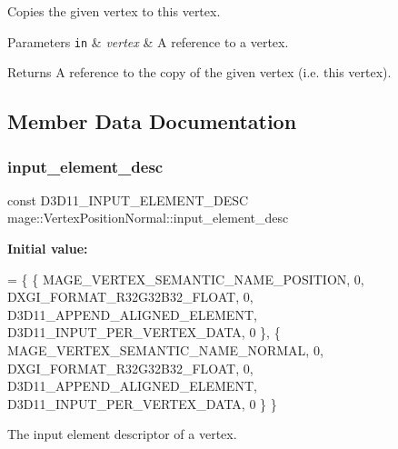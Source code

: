Copies the given vertex to this vertex.


\begin{DoxyParams}[1]{Parameters}
\mbox{\tt in}  & {\em vertex} & A reference to a vertex. \\
\hline
\end{DoxyParams}
\begin{DoxyReturn}{Returns}
A reference to the copy of the given vertex (i.\+e. this vertex). 
\end{DoxyReturn}


\subsection{Member Data Documentation}
\hypertarget{structmage_1_1_vertex_position_normal_ab4765069df93930c4fecc0029503061e}{}\label{structmage_1_1_vertex_position_normal_ab4765069df93930c4fecc0029503061e} 
\subsubsection{\texorpdfstring{input\+\_\+element\+\_\+desc}{input\_element\_desc}}
{\footnotesize\ttfamily const D3\+D11\+\_\+\+I\+N\+P\+U\+T\+\_\+\+E\+L\+E\+M\+E\+N\+T\+\_\+\+D\+E\+SC mage\+::\+Vertex\+Position\+Normal\+::input\+\_\+element\+\_\+desc\hspace{0.3cm}{\ttfamily [static]}}

{\bfseries Initial value\+:}
\begin{DoxyCode}
= \{
        \{ MAGE\_VERTEX\_SEMANTIC\_NAME\_POSITION, 0, DXGI\_FORMAT\_R32G32B32\_FLOAT,    0, 
      D3D11\_APPEND\_ALIGNED\_ELEMENT, D3D11\_INPUT\_PER\_VERTEX\_DATA, 0 \},
        \{ MAGE\_VERTEX\_SEMANTIC\_NAME\_NORMAL,   0, DXGI\_FORMAT\_R32G32B32\_FLOAT,    0, 
      D3D11\_APPEND\_ALIGNED\_ELEMENT, D3D11\_INPUT\_PER\_VERTEX\_DATA, 0 \}
    \}
\end{DoxyCode}
The input element descriptor of a vertex. \hypertarget{structmage_1_1_vertex_position_normal_a09baa618081e66e21cdfe5752dbf8df6}{}\label{structmage_1_1_vertex_position_normal_a09baa618081e66e21cdfe5752dbf8df6} 
